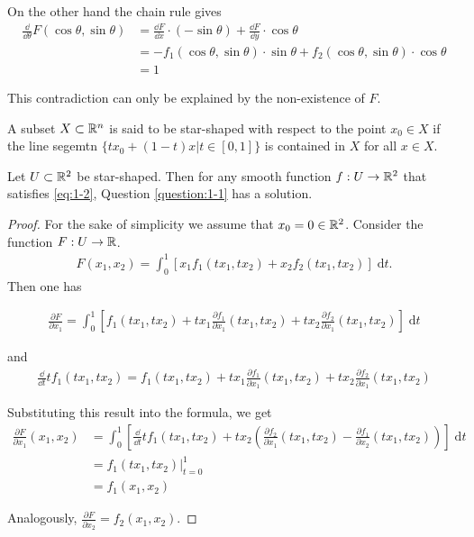 On the other hand the chain rule gives
\begin{align*}
  \frac{\dd }{\dd\theta} F(\cos\theta, \sin\theta) 
  & = \frac{\dd F}{\dd x}\cdot (-\sin\theta) + \frac{\dd F}{\dd y}\cdot \cos\theta \\
  & = -f_1 (\cos\theta, \sin\theta)\cdot\sin\theta + f_2(\cos\theta, \sin\theta)\cdot \cos\theta\\
  & = 1
\end{align*}

This contradiction can only be explained by the non-existence of $F$.

\begin{definition}
  A subset $X\subset \mathbb{R}^n$ is said to be star-shaped with respect to the point $x_0\in X$ if
  the line segemtn $\{tx_0+(1-t)x|t\in[0,1]\}$ is contained in $X$ for all $x\in X$.
\end{definition}

\begin{theorem}\label{theorem:1-4}
  Let $U\subset \mathbb{R}^2$ be star-shaped. Then for any smooth function $f:U\to \mathbb{R}^2$ that satisfies
  \eqref{eq:1-2}, Question \ref{question:1-1} has a solution.
\end{theorem}

\begin{proof}
  For the sake of simplicity we assume that $x_0=0\in\mathbb{R}^2$. Consider the function $F:U\to \mathbb{R}$.
  \begin{align*}
    F(x_1, x_2) = \int_{0}^{1}{\left[ x_1f_1(tx_1, tx_2) + x_2f_2(tx_1, tx_2) \right] \;\mathrm{d}t}.
  \end{align*}
Then one has

\begin{align*}
  \frac{\partial F}{\partial x_1} 
  = \int_{0}^{1}{\left[ f_1(tx_1, tx_2) + tx_1\frac{\partial f_1}{\partial x_1}(tx_1, tx_2) + tx_2\frac{\partial f_2}{\partial x_1}(tx_1, tx_2) \right] \;\mathrm{d}t}
\end{align*}

and 
\begin{align*}
  \frac{\dd }{\dd t} tf_1(tx_1, tx_2) 
  = f_1(tx_1, tx_2) + tx_1\frac{\partial f_1}{\partial x_1}(tx_1, tx_2) + tx_2\frac{\partial f_2}{\partial x_1}(tx_1, tx_2)
\end{align*}

Substituting this result into the formula, we get
\begin{align*}
  \frac{\partial F}{\partial x_1}(x_1, x_2)
  & = \int_{0}^{1}{\left[\frac{\dd }{\dd t}tf_1(tx_1, tx_2) + tx_2\left(\frac{\partial f_2}{\partial x_1}(tx_1, tx_2) - \frac{\partial f_1}{\partial x_2}(tx_1, tx_2) \right)\right] \;\mathrm{d}t}\\
  & = f_1(tx_1, tx_2)\big|_{t=0}^1\\
  & = f_1(x_1, x_2)
\end{align*}

Analogously, $\frac{\partial F }{\partial x_2} = f_2(x_1, x_2)$.
\end{proof}

